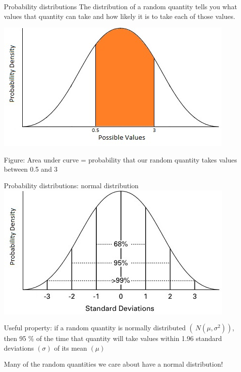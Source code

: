 \documentclass[
  ignorenonframetext,
]{beamer}
\begin{document}
\begin{frame}{Probability distributions}
\protect\hypertarget{probability-distributions}{}
The distribution of a random quantity tells you what values that
quantity can take and how likely it is to take each of those values.

\includegraphics{Normal-density.jpg}

Figure: Area under curve = probability that our random quantity takes
values between 0.5 and 3
\end{frame}

\begin{frame}{Probability distributions: normal distribution}
\protect\hypertarget{probability-distributions-normal-distribution}{}
\includegraphics{Normal.jpg}

Useful property: if a random quantity is normally distributed
\((~N(\mu, \sigma^2))\), then 95 \% of the time that quantity will take
values within 1.96 standard deviations \((\sigma)\) of its mean
\((\mu)\)

\small Many of the random quantities we care about have a normal
distribution!
\end{frame}
\end{document}
